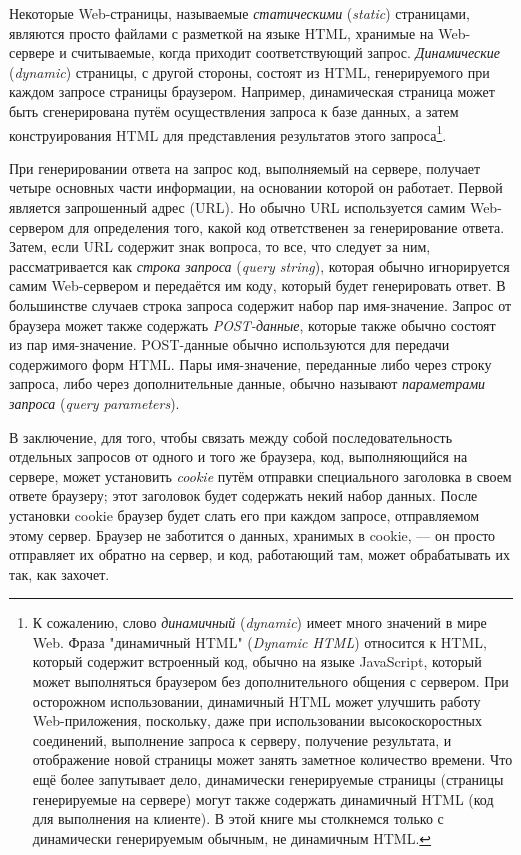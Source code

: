 Некоторые Web-страницы, называемые \textit{статическими} (\textit{static}) страницами,
являются просто файлами с разметкой на языке HTML, хранимые на Web-сервере и считываемые,
когда приходит соответствующий запрос. \textit{Динамические} (\textit{dynamic}) страницы,
с другой стороны, состоят из HTML, генерируемого при каждом запросе страницы
браузером. Например, динамическая страница может быть сгенерирована путём осуществления
запроса к базе данных, а затем конструирования HTML для представления результатов этого
запроса\footnote{К сожалению, слово \textit{динамичный} (\textit{dynamic}) имеет много
  значений в мире Web. Фраза "динамичный HTML" (\textit{Dynamic HTML}) относится к HTML,
  который содержит встроенный код, обычно на языке JavaScript, который может выполняться
  браузером без дополнительного общения с сервером. При осторожном использовании,
  динамичный HTML может улучшить работу Web-приложения, поскольку, даже при использовании
  высокоскоростных соединений, выполнение запроса к серверу, получение результата, и
  отображение новой страницы может занять заметное количество времени. Что ещё более
  запутывает дело, динамически генерируемые страницы (страницы генерируемые на сервере)
  могут также содержать динамичный HTML (код для выполнения на клиенте). В этой книге мы
  столкнемся только с динамически генерируемым обычным, не динамичным HTML.}.

При генерировании ответа на запрос код, выполняемый на сервере, получает четыре основных
части информации, на основании которой он работает. Первой является запрошенный адрес
(URL). Но обычно URL используется самим Web-сервером для определения того, какой код
ответственен за генерирование ответа. Затем, если URL содержит знак вопроса, то все, что
следует за ним, рассматривается как \textit{строка запроса} (\textit{query string}),
которая обычно игнорируется самим Web-сервером и передаётся им коду, который будет
генерировать ответ. В большинстве случаев строка запроса содержит набор пар
имя-значение. Запрос от браузера может также содержать \textit{POST-данные}, которые также
обычно состоят из пар имя-значение. POST-данные обычно используются для передачи
содержимого форм HTML. Пары имя-значение, переданные либо через строку запроса, либо через
дополнительные данные, обычно называют \textit{параметрами запроса} (\textit{query
  parameters}).

В заключение, для того, чтобы связать между собой последовательность отдельных запросов от
одного и того же браузера, код, выполняющийся на сервере, может установить \textit{cookie}
путём отправки специального заголовка в своем ответе браузеру; этот заголовок будет
содержать некий набор данных. После установки cookie браузер будет слать его при каждом
запросе, отправляемом этому сервер. Браузер не заботится о данных, хранимых в cookie, ---
он просто отправляет их обратно на сервер, и код, работающий там, может обрабатывать их
так, как захочет.

